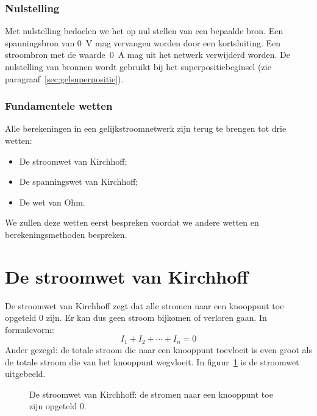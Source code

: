 \subsubsection*{Nulstelling}
Met nulstelling bedoelen we het op nul stellen van een bepaalde bron. Een spanningsbron
van \SI{0}{\volt} mag vervangen worden door een kortsluiting. Een stroombron met de
waarde~\SI{0}{\ampere} mag uit het netwerk verwijderd worden. De nulstelling van bronnen
wordt gebruikt bij het superpositiebeginsel (zie paragraaf~\ref{sec:gelsuperpositie}).

\subsubsection*{Fundamentele wetten}
Alle berekeningen in een gelijkstroomnetwerk zijn terug te brengen tot drie wetten:
\begin{itemize}
\item De stroomwet van Kirchhoff;
\item De spanningswet van Kirchhoff;
\item De wet van Ohm.
\end{itemize}
We zullen deze wetten eerst bespreken voordat we andere wetten en berekeningsmethoden bespreken.

\section{De stroomwet van Kirchhoff}
De stroomwet van Kirchhoff zegt dat alle stromen naar een knooppunt toe opgeteld 0 zijn.
Er kan dus geen stroom bijkomen of verloren gaan. In formulevorm:
\begin{equation}
I_1 + I_2 + \cdots + I_n = 0
\end{equation}
Ander gezegd: de totale stroom die naar een knooppunt toevloeit is even groot als de
totale stroom die van het knooppunt wegvloeit. In figuur~\ref{fig:gelstroomwetKirchhoff}
is de stroomwet uitgebeeld.

\begin{figure}[!ht]
\centering
{}
\caption{De stroomwet van Kirchhoff: de stromen naar een knooppunt toe zijn opgeteld 0.}
\label{fig:gelstroomwetKirchhoff}
\end{figure}

